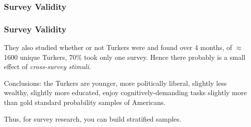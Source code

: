 \documentclass[slides]{beamer} %
\begin{document}
\begin{frame}\frametitle{Survey Validity}


\end{frame}

\begin{frame}\frametitle{Survey Validity}

They also studied whether or not Turkers were  and found over 4 months, of $\approx$ 1600 unique Turkers, 70\% took only one survey. Hence there probably is a small effect of \textit{cross-survey stimuli}. \pause

\vspace{0.2cm}

Conclusions: the Turkers are younger, more politically liberal, slightly less wealthy, slightly more educated, enjoy cognitively-demanding tasks slightly more than gold standard probability samples of Americans. \pause

\vspace{0.2cm}

Thus, for survey research, you can build stratified samples.

\end{frame}
\end{document}
